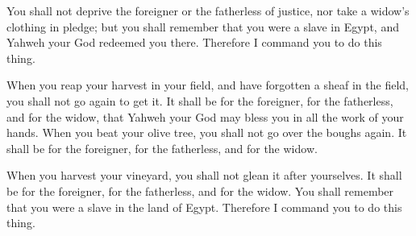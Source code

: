 {\par }{\PP {}You shall not deprive the foreigner or the fatherless of justice, nor take a widow’s clothing in pledge;
but you shall remember that you were a slave in Egypt, and Yahweh your God redeemed you there. Therefore I command you to do this thing.
\par }{\PP {}When you reap your harvest in your field, and have forgotten a sheaf in the field, you shall not go again to get it. It shall be for the foreigner, for the fatherless, and for the widow, that Yahweh your God may bless you in all the work of your hands.
When you beat your olive tree, you shall not go over the boughs again. It shall be for the foreigner, for the fatherless, and for the widow.
\par }{\PP {}When you harvest your vineyard, you shall not glean it after yourselves. It shall be for the foreigner, for the fatherless, and for the widow.
You shall remember that you were a slave in the land of Egypt. Therefore I command you to do this thing.

}
